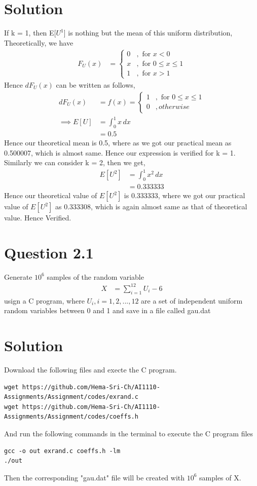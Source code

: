 \documentclass[16pt, a4paper, two column]{article}
\begin{document}
\section*{Solution}
If k = 1, then E[$U^1$] is nothing but the mean of this uniform distribution,\newline
Theoretically, we have 
\begin{align}
	F_U(x) &= \begin{cases} 0 &, \text{ for } x < 0\\
	 x &, \text{ for } 0 \leq x \leq 1 \\
	 1 &, \text{ for } x > 1\end{cases}
\end{align}
Hence $dF_U(x)$ can be written as follows,
\begin{align}
	dF_U(x) &= f(x) = \begin{cases} 1 &,\text{ for } 0 \leq x \leq 1 \\
	0 &, otherwise\end{cases} \\
	\implies E[U] &= \int_{0}^{1} x \,dx \\
	&= 0.5
\end{align}
Hence our theoretical mean is 0.5, where as we got our practical mean as 0.500007, which is almost same.\newline
Hence our expression is verified for k = 1.\newline
Similarly we can consider k = 2, then we get,
\begin{align}
	E[U^2] &= \int_{0}^{1} x^2 \, dx \\
	&= 0.333333 
\end{align}
Hence our theoretical value of $E[U^2]$ is 0.333333, where we got our practical value of $E[U^2]$ as 0.333308, which is again almost same as that of theoretical value.\newline
Hence Verified.

\section*{Question 2.1}
Generate $10^6$ samples of the random variable
\begin{align}
	X &= \sum_{i=1}^{12} U_i - 6
\end{align}
usign a C program, where $U_i, i = 1, 2, ..., 12$ are a set of independent uniform random variables between 0 and 1 and save in a file called gau.dat
\section*{Solution}
Download the following files and execte the C program.
\begin{lstlisting}
wget https://github.com/Hema-Sri-Ch/AI1110-Assignments/Assignment/codes/exrand.c
wget https://github.com/Hema-Sri-Ch/AI1110-Assignments/Assignment/codes/coeffs.h
\end{lstlisting}
And run the following commands in the terminal to execute the C program files
\begin{lstlisting}
gcc -o out exrand.c coeffs.h -lm
./out
\end{lstlisting}
Then the corresponding "gau.dat" file will be created with $10^6$ samples of X.
\end{document}
